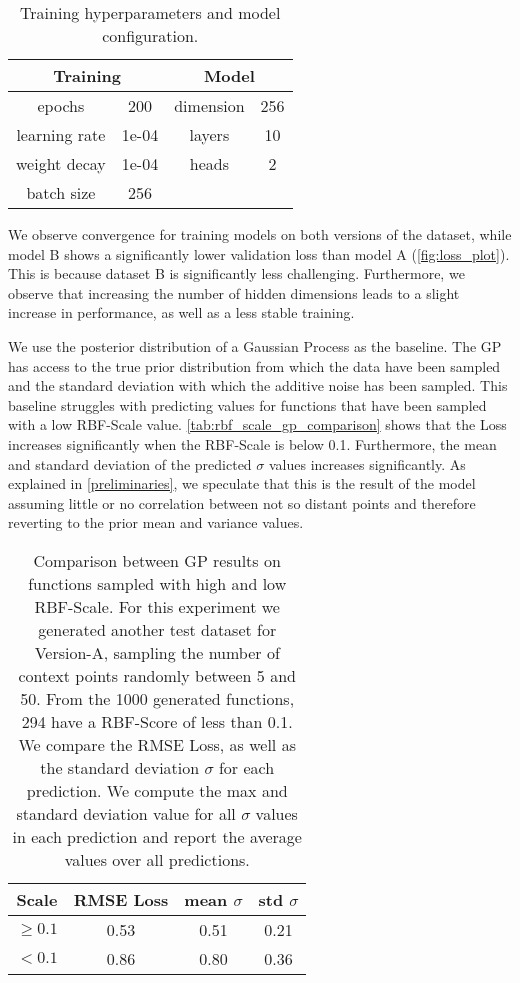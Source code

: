 \begin{table}[]
	\centering
	\caption{Training hyperparameters and model configuration.}
	\begin{tabular}{c c c c}
		\toprule
		\multicolumn{2}{c}{Training} & \multicolumn{2}{c}{Model} \\
		\midrule
		epochs & 200 & dimension & 256 \\
		learning rate & 1e-04 & layers & 10\\
		weight decay & 1e-04 & heads & 2  \\
		batch size & 256 & \\\bottomrule
	\end{tabular}
	\label{tab:hyperparams}
\end{table}

We observe convergence for training models on both versions of the dataset, while model B shows a significantly lower validation loss than model A (\autoref{fig:loss_plot}). This is because dataset B is significantly less challenging. Furthermore, we observe that increasing the number of hidden dimensions leads to a slight increase in performance, as well as a less stable training.

We use the posterior distribution of a Gaussian Process as the baseline. The GP has access to the true prior distribution from which the data have been sampled and the standard deviation with which the additive noise has been sampled. This baseline struggles with predicting values for functions that have been sampled with a low RBF-Scale value. \autoref{tab:rbf_scale_gp_comparison} shows that the Loss increases significantly when the RBF-Scale is below 0.1. Furthermore, the mean and standard deviation of the predicted $\sigma$ values increases significantly. As explained in \autoref{preliminaries}, we speculate that this is the result of the model assuming little or no correlation between not so distant points and therefore reverting to the prior mean and variance values.

\begin{table}[]
	\centering
	\caption{Comparison between GP results on functions sampled with high and low RBF-Scale. For this experiment we generated another test dataset for Version-A, sampling the number of context points randomly between 5 and 50. From the 1000 generated functions, 294 have a RBF-Score of less than 0.1. We compare the RMSE Loss, as well as the standard deviation $\sigma$ for each prediction. We compute the max and standard deviation value for all $\sigma$ values in each prediction and report the average values over all predictions.}
	\begin{tabular}{c c c c}
		\toprule
		Scale & RMSE Loss & mean $\sigma$ & std $\sigma$\\
		\midrule
		$\geq 0.1$ & 0.53 & 0.51 & 0.21\\
		$< 0.1$ & 0.86 & 0.80 & 0.36\\\bottomrule
	\end{tabular}
	\label{tab:rbf_scale_gp_comparison}
\end{table}



